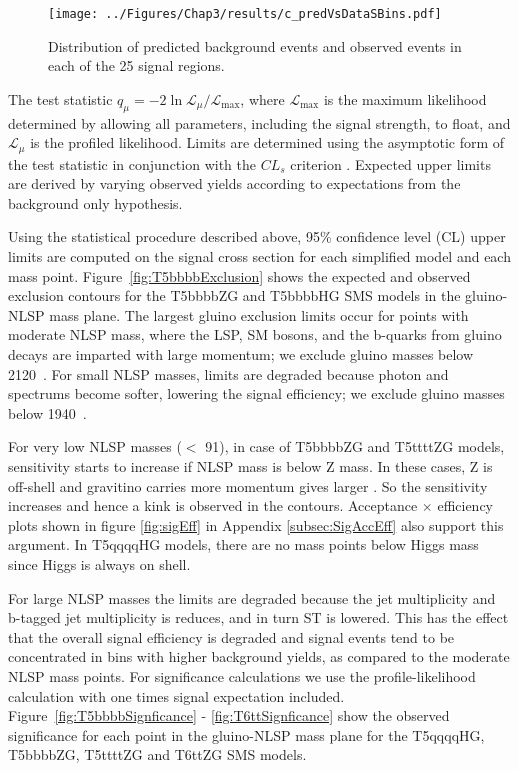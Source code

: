 \begin{figure}
\centering
\texttt{[image: ../Figures/Chap3/results/c\_predVsDataSBins.pdf]}
\caption{Distribution of predicted background events and observed events in each of the 25 signal regions.}
\label{fig:predVsData}
\end{figure}

The test statistic $q_{\mu} = -2 \ln{\mathcal{L}_{\mu}/ \mathcal{L}_{\mathrm{max}}}$, 
where $\mathcal{L}_{\mathrm{max}}$ 
is the maximum likelihood determined by allowing all parameters, including the signal 
strength, to float, and $\mathcal{L}_{\mu}$
is the profiled likelihood. Limits are determined using the asymptotic form of the test 
statistic \cite{Cowan:2010js} 
in conjunction with the $CL_s$ criterion \cite{Junk1999,bib-cls}. Expected 
upper limits are derived by varying observed yields according to expectations from the 
background only hypothesis.

Using the statistical procedure described above, 95\% confidence level (CL) upper limits are
computed on the signal cross section for each simplified model and each mass point.  
Figure~\ref{fig:T5bbbbExclusion} shows the expected and observed exclusion contours for the 
T5bbbbZG and T5bbbbHG SMS 
models in the gluino-NLSP mass plane.  The largest gluino exclusion limits occur for 
points with moderate NLSP mass, where the LSP, SM bosons, and the b-quarks from
gluino decays are imparted with large momentum; we exclude gluino 
masses below 2120~\gev.  For small NLSP masses, limits are degraded because
photon \pt and \ptmiss spectrums become softer, lowering the signal efficiency;
we exclude gluino masses below 1940~\gev.

For very low NLSP masses ($<$ 91\gev), in
case of T5bbbbZG and T5ttttZG models, sensitivity starts to increase if NLSP mass is
below Z mass. In these cases, Z is off-shell and gravitino carries more momentum gives larger \ptmiss.
So the sensitivity increases and hence a kink is observed in the contours. Acceptance $\times$ efficiency plots
shown in figure \ref{fig:sigEff} in Appendix \ref{subsec:SigAccEff} also support this argument.
In T5qqqqHG models, there are no mass points below Higgs mass since Higgs is always on shell.

For large NLSP masses the limits are degraded because the jet multiplicity and b-tagged jet multiplicity
is reduces, and in turn ST is lowered.  This has the effect that the overall 
signal efficiency is degraded and signal events tend to be concentrated in bins
with higher background yields, as compared to the moderate NLSP mass points.  
For significance calculations we use the profile-likelihood calculation with one times signal 
expectation included.  Figure~\ref{fig:T5bbbbSignficance} - \ref{fig:T6ttSignficance} show the observed significance
for each point in the gluino-NLSP mass plane for the T5qqqqHG, T5bbbbZG, T5ttttZG and T6ttZG SMS models.

